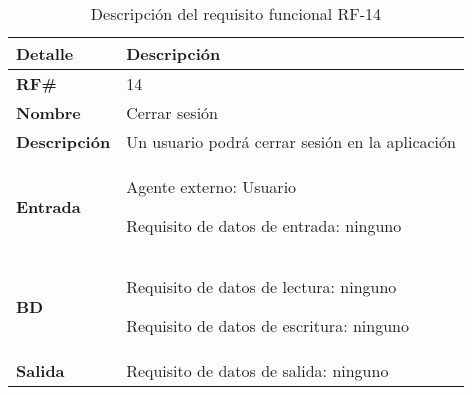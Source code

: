 \begin{table}[H]
    \centering
    \begin{tabular}{|p{3cm}|p{8cm}|}
        \hline
        \rowcolor{lightgray}
        \rowcolor{lightgray}
        \textbf{Detalle} & \textbf{Descripción} \\
        \hline
        \textbf{RF\#} & 14 \\
        \hline
        \textbf{Nombre} & Cerrar sesión \\
        \hline
        \textbf{Descripción} & Un usuario podrá cerrar sesión en la aplicación \\
        \hline
        \textbf{Entrada} &
        Agente externo: Usuario

        Requisito de datos de entrada: ninguno \\
        \hline
        \textbf{BD} &
        Requisito de datos de lectura: ninguno

        Requisito de datos de escritura: ninguno \\
        \hline
        \textbf{Salida} & Requisito de datos de salida: ninguno \\
        \hline
    \end{tabular}
    \caption{Descripción del requisito funcional RF-14}
    \label{tab:rf-14}
\end{table}
